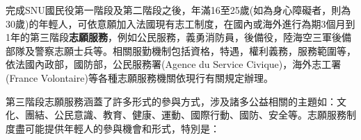 \documentclass[a4paper,14pt]{extarticle}
\theoremstyle{plain}
\theoremstyle{remark}
\numberwithin{equation}{section}
\begin{document}

完成SNU國民役第一階段及第二階段之後，年滿16至25歲(如為身心障礙者，則為30歲)的年輕人，可依意願加入法國現有志工制度，在國內或海外進行為期3個月到1年的第三階段\textbf{志願服務}，例如公民服務，義勇消防員，後備役，陸海空三軍後備部隊及警察志願士兵等。相關服勤機制包括資格，特遇，權利義務，服務範圍等，依法國內政部，國防部，公民服務署(Agence du Service Civique)，海外志工署(France Volontaire)等各種志願服務機關依現行有關規定辦理。



第三階段志願服務涵蓋了許多形式的參與方式，涉及諸多公益相關的主題如：文化、團結、公民意識、教育、健康、運動、國際行動、國防、安全等。志願服務制度盡可能提供年輕人的參與機會和形式，特別是：
\end{document}
